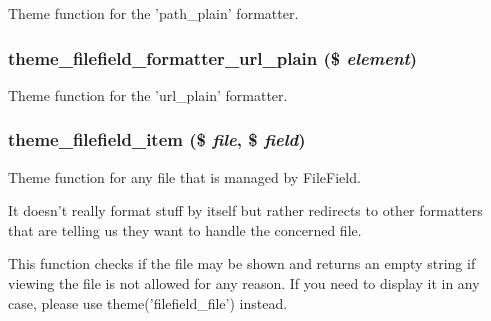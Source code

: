 Theme function for the 'path\_\-plain' formatter. \hypertarget{filefield__formatter_8inc_c506f82b18a61d6682fec927a2817c79}{
\subsubsection[{theme\_\-filefield\_\-formatter\_\-url\_\-plain}]{\setlength{\rightskip}{0pt plus 5cm}theme\_\-filefield\_\-formatter\_\-url\_\-plain (\$ {\em element})}}
\label{filefield__formatter_8inc_c506f82b18a61d6682fec927a2817c79}


Theme function for the 'url\_\-plain' formatter. \hypertarget{filefield__formatter_8inc_fb466d739eaf8509ae22ad7a025a7edb}{
\subsubsection[{theme\_\-filefield\_\-item}]{\setlength{\rightskip}{0pt plus 5cm}theme\_\-filefield\_\-item (\$ {\em file}, \/  \$ {\em field})}}
\label{filefield__formatter_8inc_fb466d739eaf8509ae22ad7a025a7edb}


Theme function for any file that is managed by FileField.

It doesn't really format stuff by itself but rather redirects to other formatters that are telling us they want to handle the concerned file.

This function checks if the file may be shown and returns an empty string if viewing the file is not allowed for any reason. If you need to display it in any case, please use theme('filefield\_\-file') instead. 